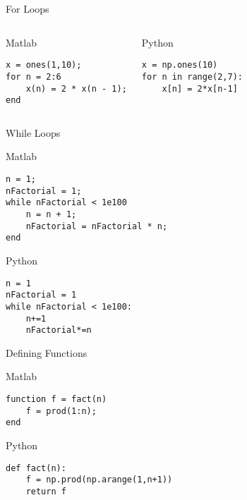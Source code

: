 \documentclass[xcolor={dvipsnames}]{beamer}
\begin{document}
\begin{frame}[fragile]{For Loops}

\begin{columns}
\begin{block}{Matlab}
\begin{verbatim}
x = ones(1,10);
for n = 2:6
    x(n) = 2 * x(n - 1);
end
\end{verbatim}
\end{block}

\begin{block}{Python}
\begin{verbatim}
x = np.ones(10)
for n in range(2,7):
    x[n] = 2*x[n-1]
    
\end{verbatim}
\end{block}
\end{columns}
\end{frame}

\begin{frame}[fragile]{While Loops}


\begin{block}{Matlab}
\begin{verbatim}
n = 1;
nFactorial = 1;
while nFactorial < 1e100
    n = n + 1;
    nFactorial = nFactorial * n;
end
\end{verbatim}
\end{block}

\begin{block}{Python}
\begin{verbatim}
n = 1
nFactorial = 1
while nFactorial < 1e100:
    n+=1
    nFactorial*=n

\end{verbatim}
\end{block}
\end{frame}

\begin{frame}[fragile]{Defining Functions}

\begin{block}{Matlab}
\begin{verbatim}
function f = fact(n)
    f = prod(1:n);
end
\end{verbatim}
\end{block}

\begin{block}{Python}
\begin{verbatim}
def fact(n):
    f = np.prod(np.arange(1,n+1))
    return f
\end{verbatim}
\end{block}

\end{frame}
\end{document}
